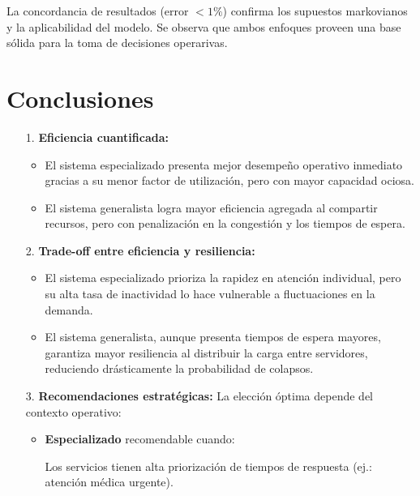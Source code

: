 \documentclass[letterpaper, 12pt]{report}
\begin{document}
La concordancia de resultados (error $< 1 \%$) confirma los supuestos markovianos y la aplicabilidad del modelo. Se observa que ambos enfoques proveen una base s\'olida para la toma de decisiones operarivas.

\chapter{Conclusiones}



\begin{itemize}
\item[1.] \textbf{Eficiencia cuantificada:}

\begin{itemize}
\item El sistema especializado presenta mejor desempeño operativo inmediato  gracias a su menor factor de utilización, pero con mayor capacidad ociosa.
\item El sistema generalista logra mayor eficiencia agregada al compartir recursos, pero con penalización en la congesti\'on y los tiempos de espera.
\end{itemize}



\item[2.] \textbf{Trade-off entre eficiencia y resiliencia:} 

\begin{itemize}
 \item   El sistema especializado prioriza la rapidez en atención individual, pero su alta tasa de inactividad lo hace vulnerable a fluctuaciones en la demanda. 

\item   El sistema generalista, aunque presenta tiempos de espera mayores, garantiza mayor resiliencia al distribuir la carga entre servidores, reduciendo drásticamente la probabilidad de colapsos. 
\end{itemize}



\item[3.] \textbf{Recomendaciones estratégicas:}
La elección óptima depende del contexto operativo:
\begin{itemize}

    
    \item \textbf{Especializado} recomendable cuando:

    Los servicios tienen alta priorización de tiempos de respuesta (ej.: atención médica urgente).


\end{itemize}
\end{itemize}
\end{document}
